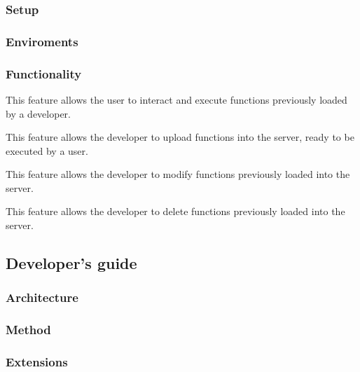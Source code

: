 		\subsubsection{Setup} %
		
		\subsubsection{Enviroments} %
		
		\subsubsection{Functionality} %
					This feature allows the user to interact and execute functions previously loaded by a developer.
					
					This feature allows the developer to upload functions into the server, ready to be executed by a user.
				
					This feature allows the developer to modify functions previously loaded into the server.
				
					This feature allows the developer to delete functions previously loaded into the server.
	
	
	\subsection{Developer's guide}
	
		\subsubsection{Architecture} %
		
		\subsubsection{Method} %
			
		
		\subsubsection{Extensions}  %